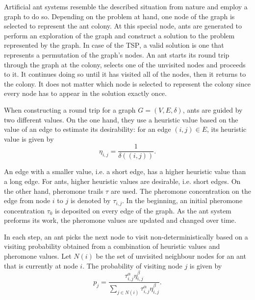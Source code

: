 Artificial ant systems resemble the described situation from nature and employ a graph to do so. Depending on the problem at hand, one node of the graph is selected to represent the ant colony. At this special node, ants are generated to perform an exploration of the graph and construct a solution to the problem represented by the graph. In case of the \textsc{TSP}, a valid solution is one that represents a permutation of the graph's nodes. An ant starts its round trip through the graph at the colony, selects one of the unvisited nodes and proceeds to it. It continues doing so until it has visited all of the nodes, then it returns to the colony. It does not matter which node is selected to represent the colony since every node has to appear in the solution exactly once.

When constructing a round trip for a graph $G = \left( V, E, \delta \right)$, ants are guided by two different values. On the one hand, they use a heuristic value based on the value of an edge to estimate its desirability: for an edge $\left(i, j\right) \in E$, its heuristic value is given by
\vspace*{-0.5em}
\begin{equation}
  \label{eqn:eta}
  \eta_{i,j} = \frac{1}{\delta \left( \left(i, j \right) \right)}.
\end{equation}

\vspace*{-0.5em}
An edge with a smaller value, i.e. a short edge, has a higher heuristic value than a long edge. For ants, higher heuristic values are desirable, i.e. short edges. On the other hand, pheromone trails $\tau$ are used. The pheromone concentration on the edge from node $i$ to $j$ is denoted by $\tau_{i,j}$. In the beginning, an initial pheromone concentration $\tau_0$ is deposited on every edge of the graph. As the ant system preforms its work, the pheromone values are updated and changed over time.


In each step, an ant picks the next node to visit non-deterministically based on a visiting probability obtained from a combination of heuristic values and pheromone values. Let $N \left( i \right)$ be the set of unvisited neighbour nodes for an ant that is currently at node $i$. The probability of visiting node $j$ is given by
\vspace*{-0.5em}
\begin{equation}
  \label{eqn:probability}
  p_{j} = \frac{\tau_{i,j}^\alpha \eta_{i,j}^\beta}{\sum_{j \in N \left( i \right)} \tau_{i,j}^\alpha \eta_{i,j}^\beta}.
\end{equation}


